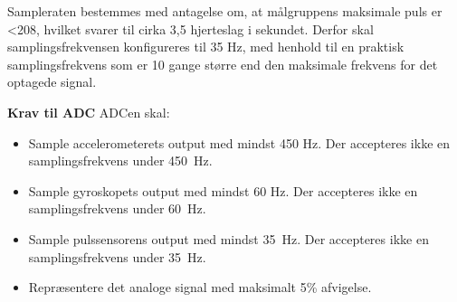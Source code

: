 Sampleraten bestemmes med antagelse om, at målgruppens maksimale puls er <208, hvilket svarer til cirka 3,5 hjerteslag i sekundet. Derfor skal samplingsfrekvensen konfigureres til 35 Hz, med henhold til en praktisk samplingsfrekvens som er 10 gange større end den maksimale frekvens for det optagede signal. \citep{Webster2011}

\textbf{Krav til ADC} \newline
ADCen skal:
\begin{itemize}
\item Sample accelerometerets output med mindst 450 Hz. Der accepteres ikke en samplingsfrekvens under 450~Hz.
\item Sample gyroskopets output med mindst 60 Hz. Der accepteres ikke en samplingsfrekvens under 60~Hz.
\item Sample pulssensorens output med mindst 35~Hz. Der accepteres ikke en samplingsfrekvens under 35~Hz. 
\item Repræsentere det analoge signal med maksimalt 5\% afvigelse. 
\end{itemize}
%

